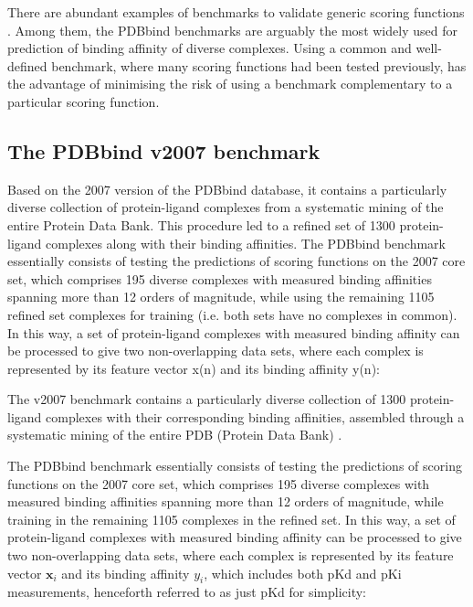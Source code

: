 \documentclass{llncs}
\begin{document}
There are abundant examples of benchmarks to validate generic scoring functions \cite{1455,1456,571,1457}. Among them, the PDBbind benchmarks \cite{1313,1426} are arguably the most widely used for prediction of binding affinity of diverse complexes. Using a common and well-defined benchmark, where many scoring functions had been tested previously, has the advantage of minimising the risk of using a benchmark complementary to a particular scoring function.

\subsection{The PDBbind v2007 benchmark}


Based on the 2007 version of the PDBbind database, it contains a particularly diverse collection of protein-ligand complexes from a systematic mining of the entire Protein Data Bank. This procedure led to a refined set of 1300 protein-ligand complexes along with their binding affinities. The PDBbind benchmark essentially consists of testing the predictions of scoring functions on the 2007 core set, which comprises 195 diverse complexes with measured binding affinities spanning more than 12 orders of magnitude, while using the remaining 1105 refined set complexes for training (i.e. both sets have no complexes in common). In this way, a set of protein-ligand complexes with measured binding affinity can be processed to give two non-overlapping data sets, where each complex is represented by its feature vector x(n) and its binding affinity y(n):

The v2007 benchmark contains a particularly diverse collection of 1300 protein-ligand complexes with their corresponding binding affinities, assembled through a systematic mining of the entire PDB (Protein Data Bank) \cite{540,537}.

The PDBbind benchmark essentially consists of testing the predictions of scoring functions on the 2007 core set, which comprises 195 diverse complexes with measured binding affinities spanning more than 12 orders of magnitude, while training in the remaining 1105 complexes in the refined set. In this way, a set of protein-ligand complexes with measured binding affinity can be processed to give two non-overlapping data sets, where each complex is represented by its feature vector $\mathbf x_i$ and its binding affinity $y_i$, which includes both pKd and pKi measurements, henceforth referred to as just pKd for simplicity:
\end{document}
